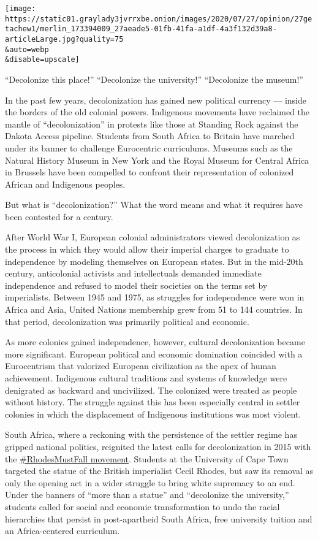 \texttt{[image: https://static01.graylady3jvrrxbe.onion/images/2020/07/27/opinion/27getachew1/merlin\_173394009\_27aeade5-01fb-41fa-a1df-4a3f132d39a8-articleLarge.jpg?quality=75\\\&auto=webp\\\&disable=upscale]}

``Decolonize this place!'' ``Decolonize the university!'' ``Decolonize
the museum!''

In the past few years, decolonization has gained new political currency
--- inside the borders of the old colonial powers. Indigenous movements
have reclaimed the mantle of ``decolonization'' in protests like those
at Standing Rock against the Dakota Access pipeline. Students from South
Africa to Britain have marched under its banner to challenge Eurocentric
curriculums. Museums such as the Natural History Museum in New York and
the Royal Museum for Central Africa in Brussels have been compelled to
confront their representation of colonized African and Indigenous
peoples.

But what is ``decolonization?'' What the word means and what it requires
have been contested for a century.

After World War I, European colonial administrators viewed
decolonization as the process in which they would allow their imperial
charges to graduate to independence by modeling themselves on European
states. But in the mid-20th century, anticolonial activists and
intellectuals demanded immediate independence and refused to model their
societies on the terms set by imperialists. Between 1945 and 1975, as
struggles for independence were won in Africa and Asia, United Nations
membership grew from 51 to 144 countries. In that period, decolonization
was primarily political and economic.

As more colonies gained independence, however, cultural decolonization
became more significant. European political and economic domination
coincided with a Eurocentrism that valorized European civilization as
the apex of human achievement. Indigenous cultural traditions and
systems of knowledge were denigrated as backward and uncivilized. The
colonized were treated as people without history. The struggle against
this has been especially central in settler colonies in which the
displacement of Indigenous institutions was most violent.

South Africa, where a reckoning with the persistence of the settler
regime has gripped national politics, reignited the latest calls for
decolonization in 2015 with the
\href{https://www.sabcnews.com/sabcnews/rhodesmustfall-wants-statues-representing-oppression-racism-removed/}{\#RhodesMustFall
movement}. Students at the University of Cape Town targeted the statue
of the British imperialist Cecil Rhodes, but saw its removal as only the
opening act in a wider struggle to bring white supremacy to an end.
Under the banners of ``more than a statue'' and ``decolonize the
university,'' students called for social and economic transformation to
undo the racial hierarchies that persist in post-apartheid South Africa,
free university tuition and an Africa-centered curriculum.

